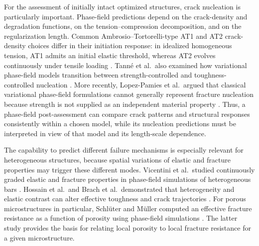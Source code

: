 \documentclass[
	pdflatex,
	sn-mathphys-num
]{sn-jnl}
\theoremstyle{thmstyleone}%
\theoremstyle{thmstyletwo}%
\theoremstyle{thmstylethree}%
\begin{document}
For the assessment of initially intact optimized structures,
crack nucleation is particularly important. Phase-field
predictions depend on the crack-density and degradation
functions, on the tension--compression decomposition, and on
the regularization length. Common Ambrosio--Tortorelli-type
AT1 and AT2 crack-density choices differ in their initiation
response: in idealized
homogeneous tension, AT1 admits an initial elastic threshold,
whereas AT2 evolves continuously under tensile loading
\cite{ambrosio_approximation_1990,ambati_review_2015,tanne_crack_2018}. Tann\'e et al.\
also examined how variational phase-field models transition
between strength-controlled and toughness-controlled
nucleation \cite{tanne_crack_2018}. More recently,
Lopez-Pamies et al.\ argued that classical variational
phase-field formulations cannot generally represent fracture
nucleation because strength is not supplied as an independent
material property \cite{lopez-pamies_classical_2024}. Thus, a
phase-field post-assessment can compare crack patterns and
structural responses consistently within a chosen model, while
its nucleation predictions must be interpreted in view of that
model and its length-scale dependence.

The capability to predict different failure mechanisms
 is especially relevant for heterogeneous
structures, because spatial variations of elastic and fracture
properties may trigger these different modes.
Vicentini et al.\ studied continuously graded elastic and
fracture properties in phase-field simulations of heterogeneous
bars \cite{vicentini_phasefield_2023}. Hossain et al.\ and
Brach et al.\ demonstrated that heterogeneity and elastic
contrast can alter effective toughness and crack trajectories
\cite{hossain_effective_2014,brach_anisotropy_2019}. For
porous microstructures in particular, Schl\"uter and M\"uller
computed an effective fracture resistance as a function of
porosity using phase-field simulations
\cite{schluter_determination_2025a}. The latter study 
provides the basis for relating local porosity to local fracture
resistance for a given microstructure.
\end{document}
